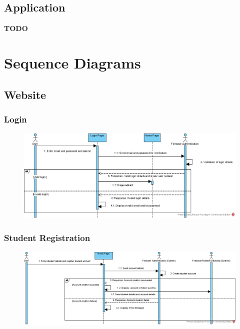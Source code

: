 \documentclass[../report.tex]{subfiles}
\begin{document}
\subsection{Application}
\textbf{TODO}

\section{Sequence Diagrams}
\subsection{Website}
\subsubsection{Login}
\begin{figure}[H]
\centering
\includegraphics[width=\textwidth]{./images/05-07-web-login.png}
\label{fig:web-login-seq}
\end{figure}

\subsubsection{Student Registration}
\begin{figure}[H]
\centering
\includegraphics[width=\textwidth]{./images/05-07-web-student-reg.png}
\label{fig:web-student-seq}
\end{figure}
\end{document}
